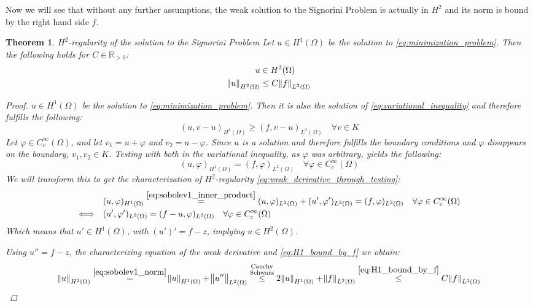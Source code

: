 \documentclass[headsepline,footsepline,footinclude=false,oneside,fontsize=11pt,paper=a4,listof=totoc,bibliography=totoc]{scrbook} %
\newtheorem{theorem}{Theorem}
\begin{document}
Now we will see that without any further assumptions, the weak solution to the Signorini Problem is actually in $H^2$ and its norm is bound by the right hand side $f$.

\begin{theorem} $H^2$-regularity of the solution to the Signorini Problem \newline
	Let $u \in H^1(\Omega)$ be the solution to \eqref{eq:minimization_problem}. Then the following holds for $C \in \mathbb{R}_{>0}$:
	\begin{align}
		u &\in H^2(\Omega) \label{eq:H2_regularity} \\
		\norm{u}_{H^2(\Omega)} &\leq C\norm{f}_{L^2(\Omega)} \label{eq:H2_norm_bound_by_f} 
	\end{align}
	\begin{proof}
		$u \in H^1(\Omega)$ be the solution to \eqref{eq:minimization_problem}. Then it is also the solution of \eqref{eq:variational_inequality} and therefore fulfills the following:
		\begin{equation*}
		(u,v-u)_{H^1(\Omega)} \geq (f,v-u)_{L^2(\Omega)} \quad \forall v \in K
		\end{equation*}
		Let $\varphi \in C_c^\infty(\Omega)$, and let $v_1 = u + \varphi$ and $v_2 = u - \varphi$. Since $u$ is a solution and therefore fulfills the boundary conditions and $\varphi$ disappears on the boundary, $v_1,v_2 \in K$. Testing with both in the variational inequality, as $\varphi$ was arbitrary, yields the following:
		\begin{equation*}
			(u, \varphi)_{H^1(\Omega)} = (f, \varphi)_{L^2(\Omega)} \quad \forall \varphi \in C_c^\infty(\Omega)
		\end{equation*}
		We will transform this to get the characterization of $H^2$-regularity \eqref{eq:weak_derivative_through_testing}:
		\begin{align*}
		&(u,\varphi)_{H^1(\Omega)} \overset{\eqref{eq:sobolev1_inner_product}}{=} (u,\varphi)_{L^2(\Omega)} + (u',\varphi')_{L^2(\Omega)} = (f, \varphi)_{L^2(\Omega)} \quad \forall \varphi \in C_c^\infty(\Omega) \\
		\Longleftrightarrow \quad &(u',\varphi')_{L^2(\Omega)} = (f-u,\varphi)_{L^2(\Omega)} \quad \forall \varphi \in C_c^\infty(\Omega)
		\end{align*}
		Which means that $u' \in H^1(\Omega)$, with $(u')' = f-z$, implying $u \in H^2(\Omega)$.
		
		Using $u'' = f-z$, the characterizing equation of the weak derivative and \eqref{eq:H1_bound_by_f} we obtain:
		\begin{align*}
			\norm{u}_{H^2(\Omega)}\overset{\eqref{eq:sobolev1_norm}}{=} \norm{u}_{H^1(\Omega)} + \norm{u''}_{L^2(\Omega)} 
			\overset{\substack{\text{Cauchy} \\ \text{Schwarz}}}{\leq} 2\norm{u}_{H^1(\Omega)} + \norm{f}_{L^2(\Omega)} 
			\overset{\eqref{eq:H1_bound_by_f}}{\leq} C \norm{f}_{L^2(\Omega)}
		\end{align*}
	\end{proof}
\end{theorem}
\end{document}
